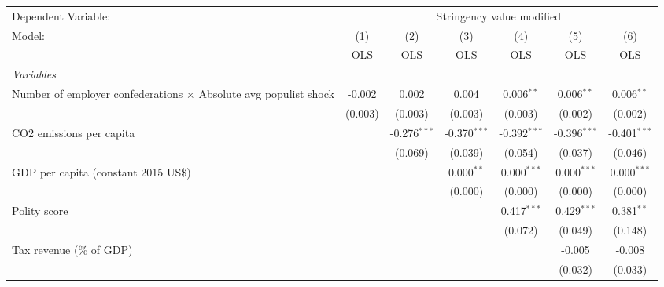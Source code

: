 
\begingroup
\centering
\begin{tabular}{lcccccc}
   \toprule
   Dependent Variable: & \multicolumn{6}{c}{Stringency value modified}\\
   Model:                                                                  & (1)     & (2)            & (3)            & (4)            & (5)            & (6)\\  
                                                                           &  OLS    & OLS            & OLS            & OLS            & OLS            & OLS\\  
   \midrule
   \emph{Variables}\\
   Number of employer confederations $\times$ Absolute avg populist shock  & -0.002  & 0.002          & 0.004          & 0.006$^{**}$   & 0.006$^{**}$   & 0.006$^{**}$\\   
                                                                           & (0.003) & (0.003)        & (0.003)        & (0.003)        & (0.002)        & (0.002)\\   
   CO2 emissions per capita                                                &         & -0.276$^{***}$ & -0.370$^{***}$ & -0.392$^{***}$ & -0.396$^{***}$ & -0.401$^{***}$\\   
                                                                           &         & (0.069)        & (0.039)        & (0.054)        & (0.037)        & (0.046)\\   
   GDP per capita (constant 2015 US\$)                                     &         &                & 0.000$^{**}$   & 0.000$^{***}$  & 0.000$^{***}$  & 0.000$^{***}$\\   
                                                                           &         &                & (0.000)        & (0.000)        & (0.000)        & (0.000)\\   
   Polity score                                                            &         &                &                & 0.417$^{***}$  & 0.429$^{***}$  & 0.381$^{**}$\\   
                                                                           &         &                &                & (0.072)        & (0.049)        & (0.148)\\   
   Tax revenue (\% of GDP)                                                 &         &                &                &                & -0.005         & -0.008\\   
                                                                           &         &                &                &                & (0.032)        & (0.033)\\   

\end{tabular}
